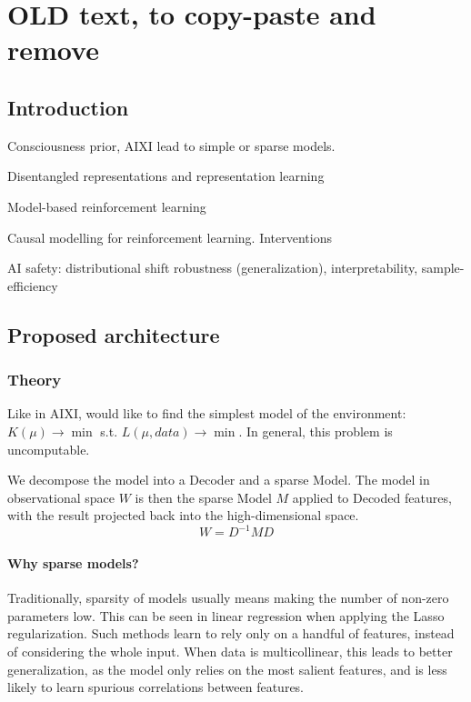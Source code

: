 \documentclass[a4paper,11pt,oneside]{report}
\begin{document}
%
%

\chapter{OLD text, to copy-paste and remove}
\section{Introduction}
Consciousness prior, AIXI lead to simple or sparse models.

Disentangled representations and representation learning

Model-based reinforcement learning

Causal modelling for reinforcement learning. Interventions

AI safety: distributional shift robustness (generalization), interpretability, sample-efficiency

\section{Proposed architecture}
\subsection{Theory}
Like in AIXI, would like to find the simplest model of the environment:
$K(\mu)\to\min$ s.t. $L(\mu, data)\to\min$. In general, this problem is uncomputable.

We decompose the model into a Decoder and a sparse Model. The model in observational space $W$ is then the sparse Model $M$ applied to Decoded features, with the result projected back into the high-dimensional space.
$$
W=D^{-1}MD
$$

\subsubsection{Why sparse models?}
Traditionally, sparsity of models usually means making the number of non-zero parameters low. This can be seen in linear regression when applying the Lasso regularization. Such methods learn to rely only on a handful of features, instead of considering the whole input. When data is multicollinear, this leads to better generalization, as the model only relies on the most salient features, and is less likely to learn spurious correlations between features.
\end{document}

